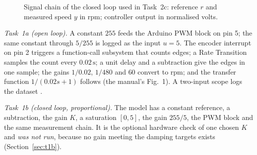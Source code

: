 \documentclass[lettersize,journal]{IEEEtran}
\newcommand{\code}[1]{\texttt{\detokenize{#1}}}
\newcommand{\Ts}{T_{\!s}}
\begin{document}
\begin{figure}[H]
\centering
{}
\caption{Signal chain of the closed loop used in Task~2c: reference $r$ and measured speed $y$ in rpm; controller output in normalised volts.}
\label{fig:chain}
\end{figure}

\emph{Task~1a (open loop).} A constant $255$ feeds the Arduino PWM block on pin 5; the same constant through $5/255$ is logged as the input $u=5$. The encoder interrupt on pin 2 triggers a function-call subsystem that counts edges; a Rate Transition samples the count every $0.02\,\text{s}$; a unit delay and a subtraction give the edges in one sample; the gains $1/0.02$, $1/480$ and $60$ convert to rpm; and the transfer function $1/(0.02s+1)$ follows (the manual's Fig.~1). A two-input scope logs the dataset \code{stepData}.

\emph{Task~1b (closed loop, proportional).} The model has a constant reference, a subtraction, the gain $K$, a saturation $[0,5]$, the gain $255/5$, the PWM block and the same measurement chain. It is the optional hardware check of one chosen $K$ and \emph{was not run}, because no gain meeting the damping targets exists (Section~\ref{sec:t1b}).
\end{document}
